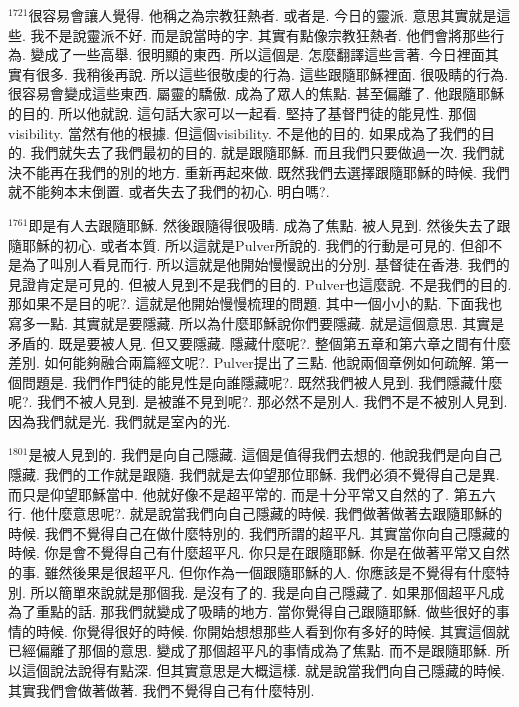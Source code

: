 \documentclass{book}
\begin{document}
$^{1721}$很容易會讓人覺得.
他稱之為宗教狂熱者.
或者是.
今日的靈派.
意思其實就是這些.
我不是說靈派不好.
而是說當時的字.
其實有點像宗教狂熱者.
他們會將那些行為.
變成了一些高舉.
很明顯的東西.
所以這個是.
怎麼翻譯這些言著.
今日裡面其實有很多.
我稍後再說.
所以這些很敬虔的行為.
這些跟隨耶穌裡面.
很吸睛的行為.
很容易會變成這些東西.
屬靈的驕傲.
成為了眾人的焦點.
甚至偏離了.
他跟隨耶穌的目的.
所以他就說.
這句話大家可以一起看.
堅持了基督門徒的能見性.
那個visibility.
當然有他的根據.
但這個visibility.
不是他的目的.
如果成為了我們的目的.
我們就失去了我們最初的目的.
就是跟隨耶穌.
而且我們只要做過一次.
我們就決不能再在我們的別的地方.
重新再起來做.
既然我們去選擇跟隨耶穌的時候.
我們就不能夠本末倒置.
或者失去了我們的初心.
明白嗎?.

$^{1761}$即是有人去跟隨耶穌.
然後跟隨得很吸睛.
成為了焦點.
被人見到.
然後失去了跟隨耶穌的初心.
或者本質.
所以這就是Pulver所說的.
我們的行動是可見的.
但卻不是為了叫別人看見而行.
所以這就是他開始慢慢說出的分別.
基督徒在香港.
我們的見證肯定是可見的.
但被人見到不是我們的目的.
Pulver也這麼說.
不是我們的目的.
那如果不是目的呢?.
這就是他開始慢慢梳理的問題.
其中一個小小的點.
下面我也寫多一點.
其實就是要隱藏.
所以為什麼耶穌說你們要隱藏.
就是這個意思.
其實是矛盾的.
既是要被人見.
但又要隱藏.
隱藏什麼呢?.
整個第五章和第六章之間有什麼差別.
如何能夠融合兩篇經文呢?.
Pulver提出了三點.
他說兩個章例如何疏解.
第一個問題是.
我們作門徒的能見性是向誰隱藏呢?.
既然我們被人見到.
我們隱藏什麼呢?.
我們不被人見到.
是被誰不見到呢?.
那必然不是別人.
我們不是不被別人見到.
因為我們就是光.
我們就是室內的光.

$^{1801}$是被人見到的.
我們是向自己隱藏.
這個是值得我們去想的.
他說我們是向自己隱藏.
我們的工作就是跟隨.
我們就是去仰望那位耶穌.
我們必須不覺得自己是異.
而只是仰望耶穌當中.
他就好像不是超平常的.
而是十分平常又自然的了.
第五六行.
他什麼意思呢?.
就是說當我們向自己隱藏的時候.
我們做著做著去跟隨耶穌的時候.
我們不覺得自己在做什麼特別的.
我們所謂的超平凡.
其實當你向自己隱藏的時候.
你是會不覺得自己有什麼超平凡.
你只是在跟隨耶穌.
你是在做著平常又自然的事.
雖然後果是很超平凡.
但你作為一個跟隨耶穌的人.
你應該是不覺得有什麼特別.
所以簡單來說就是那個我.
是沒有了的.
我是向自己隱藏了.
如果那個超平凡成為了重點的話.
那我們就變成了吸睛的地方.
當你覺得自己跟隨耶穌.
做些很好的事情的時候.
你覺得很好的時候.
你開始想想那些人看到你有多好的時候.
其實這個就已經偏離了那個的意思.
變成了那個超平凡的事情成為了焦點.
而不是跟隨耶穌.
所以這個說法說得有點深.
但其實意思是大概這樣.
就是說當我們向自己隱藏的時候.
其實我們會做著做著.
我們不覺得自己有什麼特別.
\end{document}
